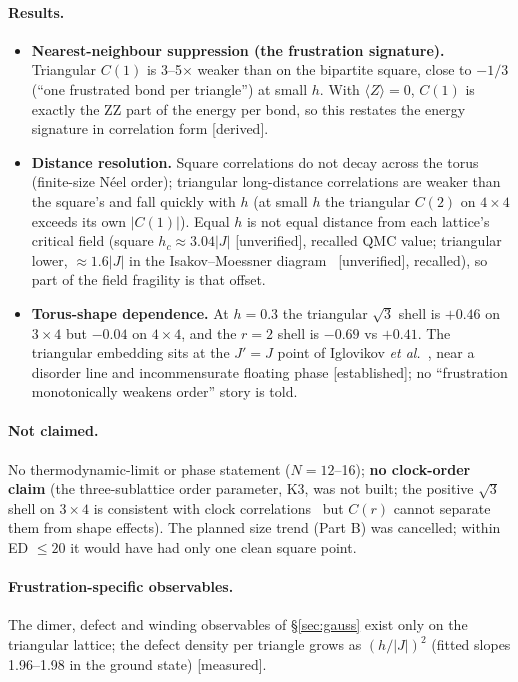 \documentclass[11pt,a4paper]{article}
\newcommand{\tg}[1]{\textsf{\small[#1]}}
\newcommand{\est}{\tg{established}}
\newcommand{\der}{\tg{derived}}
\newcommand{\mea}{\tg{measured}}
\newcommand{\unv}{\tg{unverified}}
\begin{document}
\paragraph{Results.}
\begin{itemize}
\item \textbf{Nearest-neighbour suppression (the frustration signature).} Triangular $C(1)$ is 3--5$\times$ weaker
  than on the bipartite square, close to $-1/3$ (``one frustrated bond per triangle'') at small $h$. With
  $\langle Z\rangle=0$, $C(1)$ is exactly the ZZ part of the energy per bond, so this restates the energy
  signature in correlation form \der.
\item \textbf{Distance resolution.} Square correlations do not decay across the torus (finite-size N\'eel order);
  triangular long-distance correlations are weaker than the square's and fall quickly with $h$ (at small $h$
the triangular $C(2)$ on $4\times4$ exceeds its own $|C(1)|$). Equal $h$ is not equal distance from
  each lattice's critical field (square $h_c\approx3.04|J|$ \unv{}, recalled QMC value; triangular lower,
  $\approx1.6|J|$ in the Isakov--Moessner diagram~\cite{isakov} \unv{}, recalled), so part of the field fragility is
  that offset.
\item \textbf{Torus-shape dependence.} At $h=0.3$ the triangular $\sqrt3$ shell is $+0.46$ on $3\times4$ but
  $-0.04$ on $4\times4$, and the $r=2$ shell is $-0.69$ vs $+0.41$. The triangular embedding sits at the $J'=J$
  point of Iglovikov \emph{et al.}~\cite{iglovikov}, near a disorder line and incommensurate floating phase \est;
  no ``frustration monotonically weakens order'' story is told.
\end{itemize}

\paragraph{Not claimed.} No thermodynamic-limit or phase statement ($N=12$--16); \textbf{no clock-order claim} (the
three-sublattice order parameter, K3, was not built; the positive $\sqrt3$ shell on $3\times4$ is consistent with
clock correlations~\cite{isakov,humeniuk} but $C(r)$ cannot separate them from shape effects). The planned size
trend (Part B) was cancelled; within ED $\le20$ it would have had only one clean square point.

\paragraph{Frustration-specific observables.} The dimer, defect and winding observables of \S\ref{sec:gauss} exist
only on the triangular lattice; the defect density per triangle grows as $(h/|J|)^2$ (fitted slopes 1.96--1.98 in
the ground state) \mea.
\end{document}
